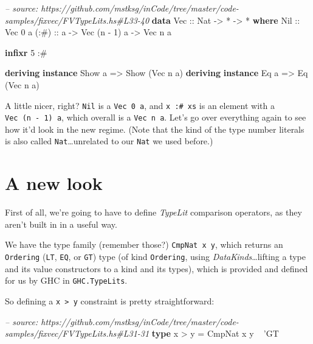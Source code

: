 \documentclass[]{article}
\newenvironment{Shaded}{}{}
\newcommand{\KeywordTok}[1]{\textcolor[rgb]{0.00,0.44,0.13}{\textbf{{#1}}}}
\newcommand{\DataTypeTok}[1]{\textcolor[rgb]{0.56,0.13,0.00}{{#1}}}
\newcommand{\DecValTok}[1]{\textcolor[rgb]{0.25,0.63,0.44}{{#1}}}
\newcommand{\CharTok}[1]{\textcolor[rgb]{0.25,0.44,0.63}{{#1}}}
\newcommand{\CommentTok}[1]{\textcolor[rgb]{0.38,0.63,0.69}{\textit{{#1}}}}
\newcommand{\OtherTok}[1]{\textcolor[rgb]{0.00,0.44,0.13}{{#1}}}
\newcommand{\FunctionTok}[1]{\textcolor[rgb]{0.02,0.16,0.49}{{#1}}}
\newcommand{\NormalTok}[1]{{#1}}
\begin{document}
\begin{Shaded}
\begin{Highlighting}[]
\CommentTok{-- source: https://github.com/mstksg/inCode/tree/master/code-samples/fixvec/FVTypeLits.hs#L33-40}
\KeywordTok{data} \DataTypeTok{Vec}\OtherTok{ ::} \DataTypeTok{Nat} \OtherTok{->} \FunctionTok{*} \OtherTok{->} \FunctionTok{*} \KeywordTok{where}
    \DataTypeTok{Nil}\OtherTok{  ::} \DataTypeTok{Vec} \DecValTok{0} \NormalTok{a}
\OtherTok{    (:#) ::} \NormalTok{a }\OtherTok{->} \DataTypeTok{Vec} \NormalTok{(n }\FunctionTok{-} \DecValTok{1}\NormalTok{) a }\OtherTok{->} \DataTypeTok{Vec} \NormalTok{n a}

\KeywordTok{infixr} \DecValTok{5} \FunctionTok{:#}

\KeywordTok{deriving} \KeywordTok{instance} \DataTypeTok{Show} \NormalTok{a }\OtherTok{=>} \DataTypeTok{Show} \NormalTok{(}\DataTypeTok{Vec} \NormalTok{n a)}
\KeywordTok{deriving} \KeywordTok{instance} \DataTypeTok{Eq} \NormalTok{a }\OtherTok{=>} \DataTypeTok{Eq} \NormalTok{(}\DataTypeTok{Vec} \NormalTok{n a)}
\end{Highlighting}
\end{Shaded}

A little nicer, right? \texttt{Nil} is a \texttt{Vec\ 0\ a}, and
\texttt{x\ :\#\ xs} is an element with a \texttt{Vec\ (n\ -\ 1)\ a}, which
overall is a \texttt{Vec\ n\ a}. Let's go over everything again to see how it'd
look in the new regime. (Note that the kind of the type number literals is also
called \texttt{Nat}\ldots{}unrelated to our \texttt{Nat} we used before.)

\section{A new look}\label{a-new-look}

First of all, we're going to have to define \emph{TypeLit} comparison operators,
as they aren't built in in a useful way.

We have the type family (remember those?) \texttt{CmpNat\ x\ y}, which returns
an \texttt{Ordering} (\texttt{LT}, \texttt{EQ}, or \texttt{GT}) type (of kind
\texttt{Ordering}, using \emph{DataKinds}\ldots{}lifting a type and its value
constructors to a kind and its types), which is provided and defined for us by
GHC in \texttt{GHC.TypeLits}.

So defining a \texttt{x\ \textgreater{}\ y} constraint is pretty
straightforward:

\begin{Shaded}
\begin{Highlighting}[]
\CommentTok{-- source: https://github.com/mstksg/inCode/tree/master/code-samples/fixvec/FVTypeLits.hs#L31-31}
\KeywordTok{type} \NormalTok{x }\FunctionTok{>} \NormalTok{y }\FunctionTok{=} \DataTypeTok{CmpNat} \NormalTok{x y }\FunctionTok{~} \CharTok{'GT}
\end{Highlighting}
\end{Shaded}
\end{document}
